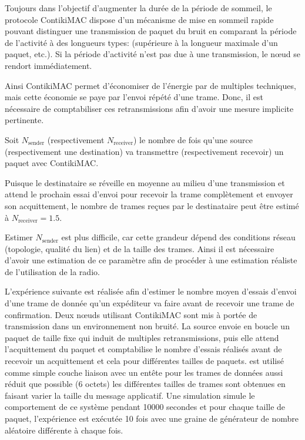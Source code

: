Toujours dans l’objectif d’augmenter la durée de la période de sommeil, le protocole ContikiMAC dispose d'un mécanisme de mise en sommeil rapide pouvant distinguer une transmission de paquet du bruit en comparant la période de l’activité à des longueurs types: (supérieure à la longueur maximale d’un paquet, etc.).
Si la période d'activité n'est pas due à une transmission, le nœud se rendort immédiatement.

Ainsi ContikiMAC permet d'économiser de l'énergie par de multiples techniques, mais cette économie se paye par l'envoi répété d'une trame.
Donc, il est nécessaire de comptabiliser ces retransmissions afin d'avoir une mesure implicite pertinente.

Soit $N_{\textrm{sender}}$ (respectivement $N_{\textrm{receiver}}$) le nombre de fois qu'une source (respectivement une destination) va transmettre (respectivement recevoir) un paquet avec ContikiMAC.

Puisque le destinataire se réveille en moyenne au milieu d'une transmission et attend le prochain essai d'envoi pour recevoir la trame complètement et envoyer son acquittement, le nombre de trames reçues par le destinataire peut être estimé à $N_{\textrm{receiver}} = 1.5$.

Estimer $N_{\textrm{sender}}$ est plus difficile, car cette grandeur dépend des conditions réseau (topologie, qualité du lien) et de la taille des trames.
Ainsi il est nécessaire d'avoir une estimation de ce paramètre afin de procéder à une estimation réaliste de l'utilisation de la radio.

L'expérience suivante est réalisée afin d'estimer le nombre moyen d'essais d'envoi d'une trame de donnée qu'un expéditeur va faire avant de recevoir une trame de confirmation.
Deux nœuds utilisant ContikiMAC sont mis à portée de transmission dans un environnement non bruité.
La source envoie en boucle un paquet de taille fixe qui induit de multiples retransmissions, puis elle attend l'acquittement du paquet et comptabilise le nombre d'essais réalisés avant de recevoir un acquittement et cela pour différentes tailles de paquets.
\ieee{} est utilisé comme simple couche liaison avec un entête pour les trames de données aussi réduit que possible (6 octets) les différentes tailles de trames sont obtenues en faisant varier la taille du message applicatif.
Une simulation simule le comportement de ce système pendant 10000 secondes et pour chaque taille de paquet, l'expérience est exécutée 10 fois avec une graine de générateur de nombre aléatoire différente à chaque fois.

